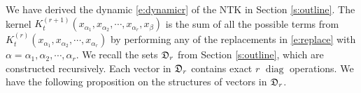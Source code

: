 \documentclass{article}
\numberwithin{equation}{section}
\newcommand{\fD}{{\frak D}}
\newcommand{\sfe}{{\mathsf e}}
\newcommand{\sfd}{{\mathsf d}}
\newcommand{\sfv}{{\mathsf v}}
\newcommand{\sfu}{{\mathsf u}}
\newcommand{\al}{\alpha}
\DeclareMathOperator{\diag}{diag}
\renewcommand{\leq}{\leqslant}
\newcommand{\1}{\mathds{1}}
\theoremstyle{plain} %
\begin{document}
%
We have derived the dynamic \eqref{e:dynamicr} of the NTK in Section \ref{s:outline}. The kernel $K^{(r+1)}_t(x_{\al_1}, x_{\al_2}, \cdots, x_{\al_r}, x_\beta)$  is the sum of all the possible terms from $K_t^{(r)}(x_{\al_1},x_{\al_2}, \cdots, x_{\al_r})$ by performing any of the replacements in \eqref{e:replace} with $\al=\al_1,\al_2, \cdots, \al_{r}$. We recall the sets $\fD_r$ from Section \ref{s:outline}, which are constructed recursively. Each vector in $\fD_r$ contains exact $r$ $\diag$ operations. 
We have the following proposition on the structures of vectors in $\fD_r$.
\end{document}
